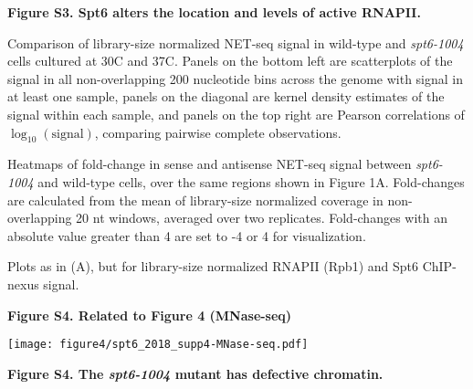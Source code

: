 \documentclass[9pt, letterpaper]{extarticle}
\begin{document}
\textbf{Figure S3. Spt6 alters the location and levels of active RNAPII.}

\begin{description}[noitemsep, topsep=0pt, align=right, labelwidth=12pt, itemindent=0pt, leftmargin=0pt]
	\item [\textbf{(A)}] Comparison of library-size normalized NET-seq signal in wild-type and \textit{spt6-1004} cells cultured at 30{\textdegree}C and 37{\textdegree}C. Panels on the bottom left are scatterplots of the signal in all non-overlapping 200 nucleotide bins across the genome with signal in at least one sample, panels on the diagonal are kernel density estimates of the signal within each sample, and panels on the top right are Pearson correlations of $\log_{10}\left(\text{signal} \right)$, comparing pairwise complete observations.
	\item [\textbf{(B)}] Heatmaps of fold-change in sense and antisense NET-seq signal between \textit{spt6-1004} and wild-type cells, over the same regions shown in Figure 1A. Fold-changes are calculated from the mean of library-size normalized coverage in non-overlapping 20 nt windows, averaged over two replicates. Fold-changes with an absolute value greater than 4 are set to -4 or 4 for visualization.
	\item [\textbf{(C)}] Plots as in (A), but for library-size normalized RNAPII (Rpb1) and Spt6 ChIP-nexus signal.
\end{description}

\newpage

\textbf{\large Figure S4. Related to Figure 4 (MNase-seq)}

{\centering \texttt{[image: figure4/spt6\_2018\_supp4-MNase-seq.pdf]}\par}

\textbf{Figure S4. The \textit{spt6-1004} mutant has defective chromatin.}
\end{document}
